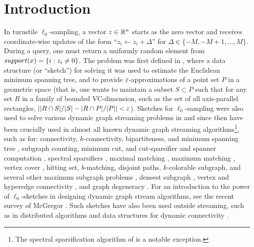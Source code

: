 \section{Introduction}\label{sec:intro}
In turnstile $\ell_0$-sampling, a vector $z\in\mathbb{R}^n$ starts as the zero vector and receives coordinate-wise updates of the form ``$z_i \leftarrow z_i + \Delta$'' for $\Delta\in\{-M,-M+1,\ldots,M\}$. During a query, one must return a uniformly random element from $\mathop{support}(x) = \{i : z_i\neq 0\}$. The problem was first defined in \cite{FrahlingIS08}, where a data structure (or ``sketch'') for solving it was used to estimate the Euclidean minimum spanning tree, and to provide $\varepsilon$-approximations of a point set $P$ in a geometric space (that is, one wants to maintain a subset $S\subset P$ such that for any set $R$ in a family of bounded VC-dimension, such as the set of all axis-parallel rectangles, $||R\cap S|/|S| - |R\cap P|/|P|| < \varepsilon$). Sketches for $\ell_0$-sampling were also used to solve various dynamic graph streaming problems in \cite{AhnGM12a} and since then have been crucially used in almost all known dynamic graph streaming algorithms\footnote{\label{specfootnote}The spectral sparsification algorithm of \cite{KapralovLMMS14} is a notable exception.}, such as for: connectivity, $k$-connectivity, bipartiteness, and minimum spanning tree \cite{AhnGM12a}, subgraph counting, minimum cut, and cut-sparsifier and spanner computation \cite{AhnGM12b}, spectral sparsifiers \cite{AhnGM13}, maximal matching \cite{ChitnisCHM15}, maximum matching \cite{AhnGM12a,BuryS15,Konrad15,AssadiKLY16,ChitnisCEHMMV16,AssadiKL17}, vertex cover \cite{ChitnisCHM15,ChitnisCEHMMV16}, hitting set, $b$-matching, disjoint paths, $k$-colorable subgraph, and several other maximum subgraph problems \cite{ChitnisCEHMMV16}, densest subgraph \cite{BhattacharyaHNT15,McGregorTVV15,EsfandiariHW16}, vertex and hyperedge connectivity \cite{GuhaMT15}, and graph degeneracy \cite{FarachColtonT16}. For an introduction to the power of $\ell_0$-sketches in designing dynamic graph stream algorithms, see the recent survey of McGregor \cite[Section 3]{McGregor14}. Such sketches have also been used outside streaming, such as in distributed algorithms \cite{HegemanPPSS15,Pandurangan0S16} and data structures for dynamic connectivity \cite{KapronKM13,Wang15,GibbKKT15}.

